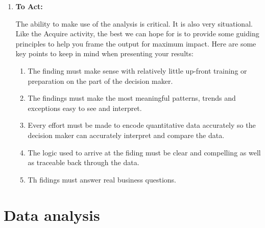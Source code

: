 \documentclass[a4paper,12pt,oneside]{report}
\begin{document}
{\begin{enumerate}
{makers. A detailed discussion on analytic maturity can be found in Data Science Maturity within an Organization. In addition to consuming the greatest effrt, the Analyze activity is by far the most complex. Th tradecraft of Data Science is an
art. While we cannot teach you how to be an artist, we can share foundational tools and techniques that can help you be successful.
Th entirety of Take Of the Training Wheels is dedicated to sharing insights we have learned over time while serving countless clients. This includes descriptions of a Data Science product lifecycle and
the Fractal Analytic Model (FAM). The Analytic Selection Process and accompanying Guide to Analytic Selection provide key insights into one of the most challenging tasks in all of Data Science – selecting the right technique for the job}
\item \textbf {To Act:} {The ability to make use of the analysis is critical. It is also very situational. Like the Acquire activity, the best we can hope for is to provide some guiding principles to help you frame the output for
maximum impact. Here are some key points to keep in mind when presenting your results:\\
\begin{enumerate}
\item{The finding must make sense with relatively little up-front training or preparation on the part of the decision maker.}
\item{The findings must make the most meaningful patterns, trends and exceptions easy to see and interpret.}
\item{Every effort must be made to encode quantitative data accurately so the decision maker can accurately interpret and compare the data.}
\item{The logic used to arrive at the fiding must be clear and compelling as well as traceable back through the data.}
\item{Th fidings must answer real business questions.}
\end{enumerate} }
\end{enumerate}
\section{Data analysis}
}
\end{document}

